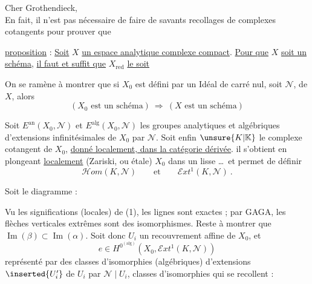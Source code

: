 \noindent Cher Grothendieck,\\

En fait, il n'est pas nécessaire de faire de savants recollages de complexes cotangents pour prouver que

\noindent \uline{proposition} : \uline{Soit} \(X\) \uline{un espace analytique complexe compact}. \uline{Pour que} \(X\) \uline{soit un schéma}, \uline{il faut et suffit que} \(X_{\mathrm{red}}\) \uline{le soit}

On se ramène à  montrer que si \(X_0\) est défini par un Idéal de carré nul, soit \(\mathscr{N}\), de \(X\), alors
\[
 (X_0\text{ est un schéma})\ \Longrightarrow\ (X\text{ est un schéma})
\]

Soit \(E^{\mathrm{an}}(X_0,\mathscr{N})\) et \(E^{\mathrm{alg}}(X_0,\mathscr{N})\) les groupes analytiques et algébriques d'extensions infinitésimales de \(X_0\) par \(\mathscr{N}\). Soit enfin \(\unsure{K|\mathbb{K}}\) le complexe cotangent de \(X_0\), \uline{donné localement, dans la catégorie dérivée}. il s'obtient en plongeant \uline{localement} (Zariski, ou étale) \(X_0\) dans un  lisse \ldots\ et permet de définir
\begingroup
\makeatletter\tagsleft@true\makeatother
\[
 \mathscr{H}om(K,\mathscr{N})\qquad\text{et}\qquad\mathscr{E}xt^{1}(K,\mathscr{N})\ .\tag*{(1)}
\]
\endgroup

Soit le diagramme :

\margin{\unsure{:}}

Vu les significations (locales) de (1), les lignes sont exactes ; par GAGA, les flèches verticales extrêmes sont des isomorphismes. Reste à  montrer que \(\operatorname{Im}(\beta)\subset\operatorname{Im}(\alpha)\).
\clearpage
{}
\noindent Soit donc \(U_i\) un recouvrement affine de \(X_0\), et
\[
 e\in H^{0^{(\mathrm{alg})}}(X_0,\mathscr{E}xt^1(K,\mathscr{N}))
\]
représenté par des classes d'isomorphies (algébriques) d'extensions \(\inserted{U'_i}\) de \(U_i\) par \(\mathscr{N}\mid U_i\), classes d'isomorphies qui se recollent :

